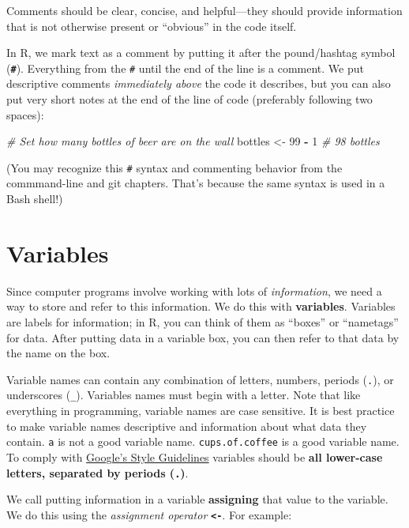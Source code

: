 \documentclass[]{book}
\newenvironment{Shaded}{\begin{snugshade}}{\end{snugshade}}
\newcommand{\DecValTok}[1]{\textcolor[rgb]{0.00,0.00,0.81}{#1}}
\newcommand{\StringTok}[1]{\textcolor[rgb]{0.31,0.60,0.02}{#1}}
\newcommand{\CommentTok}[1]{\textcolor[rgb]{0.56,0.35,0.01}{\textit{#1}}}
\newcommand{\OperatorTok}[1]{\textcolor[rgb]{0.81,0.36,0.00}{\textbf{#1}}}
\newcommand{\NormalTok}[1]{#1}
\theoremstyle{definition}
\theoremstyle{definition}
\theoremstyle{remark}
\begin{document}
Comments should be clear, concise, and helpful---they should provide
information that is not otherwise present or ``obvious'' in the code
itself.

In R, we mark text as a comment by putting it after the pound/hashtag
symbol (\textbf{\texttt{\#}}). Everything from the \texttt{\#} until the
end of the line is a comment. We put descriptive comments
\emph{immediately above} the code it describes, but you can also put
very short notes at the end of the line of code (preferably following
two spaces):

\begin{Shaded}
\begin{Highlighting}[]
\CommentTok{# Set how many bottles of beer are on the wall}
\NormalTok{bottles <-}\StringTok{ }\DecValTok{99} \OperatorTok{-}\StringTok{ }\DecValTok{1}  \CommentTok{# 98 bottles}
\end{Highlighting}
\end{Shaded}

(You may recognize this \texttt{\#} syntax and commenting behavior from
the commmand-line and git chapters. That's because the same syntax is
used in a Bash shell!)

\section{Variables}\label{variables}

Since computer programs involve working with lots of \emph{information},
we need a way to store and refer to this information. We do this with
\textbf{variables}. Variables are labels for information; in R, you can
think of them as ``boxes'' or ``nametags'' for data. After putting data
in a variable box, you can then refer to that data by the name on the
box.

Variable names can contain any combination of letters, numbers, periods
(\texttt{.}), or underscores (\texttt{\_}). Variables names must begin
with a letter. Note that like everything in programming, variable names
are case sensitive. It is best practice to make variable names
descriptive and information about what data they contain. \texttt{a} is
not a good variable name. \texttt{cups.of.coffee} is a good variable
name. To comply with
\href{https://google.github.io/styleguide/Rguide.xml\#identifiers}{Google's
Style Guidelines} variables should be \textbf{all lower-case letters,
separated by periods (\texttt{.})}.

We call putting information in a variable \textbf{assigning} that value
to the variable. We do this using the \emph{assignment operator}
\textbf{\texttt{\textless{}-}}. For example:
\end{document}

